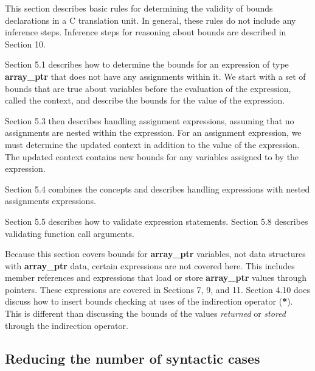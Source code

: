 \documentclass[]{article}
\begin{document}
This section describes basic rules for determining the validity of
bounds declarations in a C translation unit. In general, these rules do
not include any inference steps. Inference steps for reasoning about
bounds are described in Section 10.

Section 5.1 describes how to determine the bounds for an expression of
type \textbf{array\_ptr} that does not have any assignments within it.
We start with a set of bounds that are true about variables before the
evaluation of the expression, called the context, and describe the
bounds for the value of the expression.

Section 5.3 then describes handling assignment expressions, assuming
that no assignments are nested within the expression. For an assignment
expression, we must determine the updated context in addition to the
value of the expression. The updated context contains new bounds for any
variables assigned to by the expression.

Section 5.4 combines the concepts and describes handling expressions
with nested assignments expressions.

Section 5.5 describes how to validate expression statements. Section 5.8
describes validating function call arguments.

Because this section covers bounds for \textbf{array\_ptr} variables,
not data structures with \textbf{array\_ptr} data, certain expressions
are not covered here. This includes member references and expressions
that load or store \textbf{array\_ptr} values through pointers. These
expressions are covered in Sections 7, 9, and
11.\protect\hypertarget{ux5fRef418872208}{}{\protect\hypertarget{ux5fToc420589182}{}{\protect\hypertarget{ux5fToc422906973}{}{}}}
Section 4.10 does discuss how to insert bounds checking at uses of the
indirection operator (\textbf{*}). This is different than discussing the
bounds of the values \emph{returned} or \emph{stored} through the
indirection operator.

\subsection{\texorpdfstring{\protect\hypertarget{ux5fToc435434947}{}{\protect\hypertarget{ux5fToc437460773}{}{\protect\hypertarget{ux5fToc440445452}{}{\protect\hypertarget{ux5fToc440449234}{}{\protect\hypertarget{ux5fToc440551884}{}{\protect\hypertarget{ux5fToc424307697}{}{\protect\hypertarget{ux5fRef424822318}{}{\protect\hypertarget{ux5fRef425341709}{}{\protect\hypertarget{ux5fToc426641082}{}{}}}}}}}}}Reducing
the number of syntactic
cases}{Reducing the number of syntactic cases}}\label{reducing-the-number-of-syntactic-cases}
\end{document}
